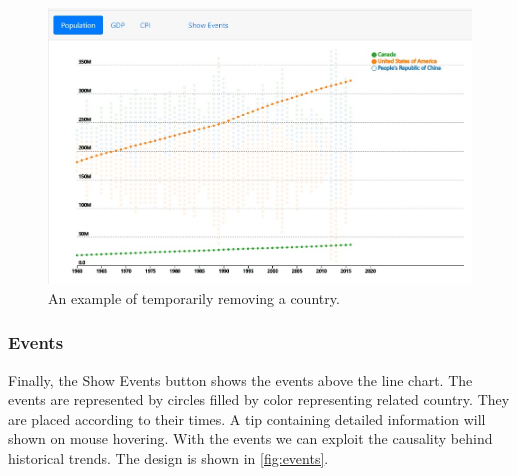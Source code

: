 \documentclass[12pt, fullpage,letterpaper]{article}
\begin{document}
\begin{figure}[h!]
    \begin{center}
        \includegraphics[width=\textwidth]{figs/hideline.jpg}
        \caption{An example of temporarily removing a country.}
        \label{fig:hideline}
    \end{center}
\end{figure}
\subsubsection{Events}

Finally, the Show Events button shows the events above the line chart.
The events are represented by circles filled by color representing related country.
They are placed according to their times. A tip containing detailed information will shown on mouse hovering.
With the events we can exploit the causality behind historical trends.
The design is shown in \ref{fig:events}.
\end{document}
